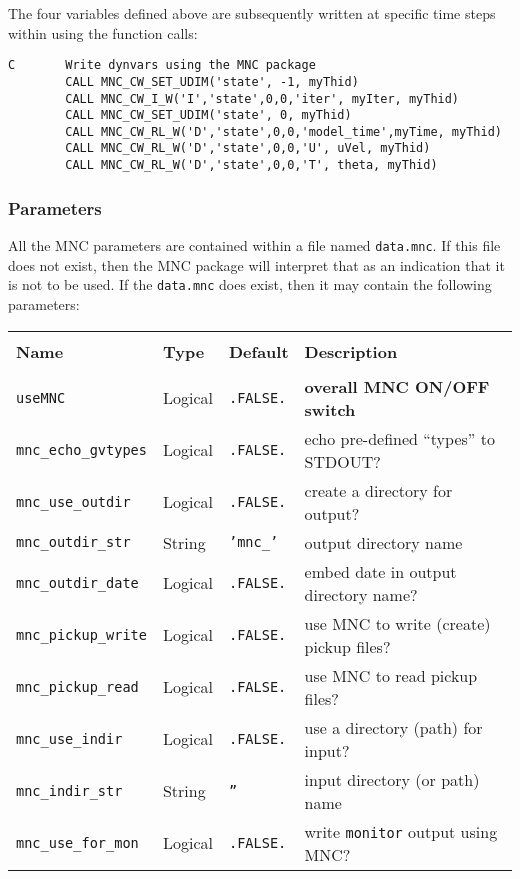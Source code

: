 The four variables defined above are subsequently written at specific
time steps within
using the function calls:
{\footnotesize
\begin{verbatim}
C       Write dynvars using the MNC package
        CALL MNC_CW_SET_UDIM('state', -1, myThid)
        CALL MNC_CW_I_W('I','state',0,0,'iter', myIter, myThid)
        CALL MNC_CW_SET_UDIM('state', 0, myThid)
        CALL MNC_CW_RL_W('D','state',0,0,'model_time',myTime, myThid)
        CALL MNC_CW_RL_W('D','state',0,0,'U', uVel, myThid)
        CALL MNC_CW_RL_W('D','state',0,0,'T', theta, myThid)
\end{verbatim}
}


\subsubsection{Parameters}

All the MNC parameters are contained within a file named
\texttt{data.mnc}.  If this file does not exist, then the MNC package
will interpret that as an indication that it is not to be used.  If
the \texttt{data.mnc} does exist, then it may contain the following
parameters:

\begin{center}
  {\footnotesize
    \begin{tabular}[htb]{|l|l|l|l|}\hline
      &  &  &  \\
      \textbf{Name}  &  \textbf{Type}  &  
      \textbf{Default}  &  \textbf{Description}  \\\hline
      &  &  &  \\
      \texttt{useMNC}  &  Logical  & \texttt{.FALSE.}  &  
      \textbf{overall MNC ON/OFF switch}  \\
      \texttt{mnc\_echo\_gvtypes}  &  Logical  & \texttt{.FALSE.}  &  
      echo pre-defined ``types'' to STDOUT?   \\
      \texttt{mnc\_use\_outdir}  &  Logical  & \texttt{.FALSE.}  &  
      create a directory for output?  \\
      \texttt{mnc\_outdir\_str}  &  String  & \texttt{'mnc\_'}  &  
      output directory name \\
      \texttt{mnc\_outdir\_date}  &  Logical  & \texttt{.FALSE.}  &  
      embed date in output directory name?  \\
      \texttt{mnc\_pickup\_write}  &  Logical  & \texttt{.FALSE.}  &  
      use MNC to write (create) pickup files?  \\
      \texttt{mnc\_pickup\_read}  &  Logical  & \texttt{.FALSE.}  &  
      use MNC to read pickup files?  \\
      \texttt{mnc\_use\_indir}  &  Logical  & \texttt{.FALSE.}  &  
      use a directory (path) for input?  \\
      \texttt{mnc\_indir\_str}  &  String  & \texttt{''}  &  
      input directory (or path) name  \\
      \texttt{mnc\_use\_for\_mon}  &  Logical  & \texttt{.FALSE.}  &  
      write \texttt{monitor} output using MNC?  \\\hline
    \end{tabular}
  }
\end{center}


